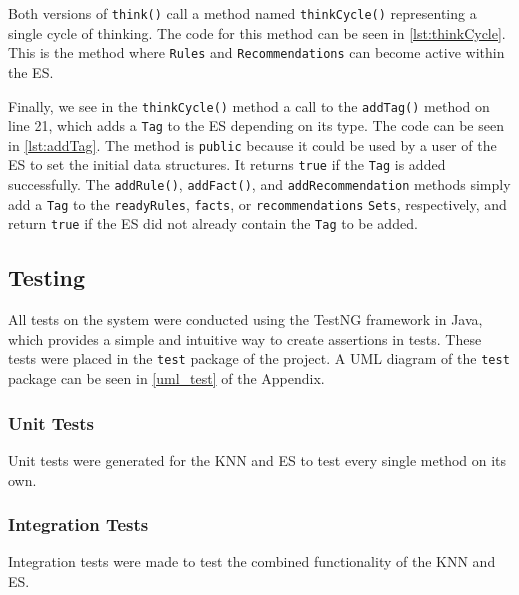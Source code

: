 \documentclass[titlepage,11pt]{article}
\def \espath {"/Users/seanstappas1/GitHub/prometheus-ai/es/ExpertSystem.java"}
\newcommand{\code}[1]{\texttt{#1}}
\begin{document}
Both versions of \code{think()} call a method named \code{thinkCycle()} representing a single cycle of thinking. The code for this method can be seen in \autoref{lst:thinkCycle}. This is the method where \code{Rules} and \code{Recommendations} can become active within the ES.



Finally, we see in the \code{thinkCycle()} method a call to the \code{addTag()} method on line 21, which adds a \code{Tag} to the ES depending on its type. The code can be seen in \autoref{lst:addTag}. The method is \code{public} because it could be used by a user of the ES to set the initial data structures. It returns \code{true} if the \code{Tag} is added successfully. The \code{addRule()}, \code{addFact()}, and \code{addRecommendation} methods simply add a \code{Tag} to the \code{readyRules}, \code{facts}, or \code{recommendations} \code{Sets}, respectively, and return \code{true} if the ES did not already contain the \code{Tag} to be added.



\subsection{Testing}

All tests on the system were conducted using the TestNG framework in Java, which provides a simple and intuitive way to create assertions in tests. These tests were placed in the \code{test} package of the project. A UML diagram of the \code{test} package can be seen in \autoref{uml_test} of the Appendix.

\subsubsection{Unit Tests}

Unit tests were generated for the KNN and ES to test every single method on its own.

\subsubsection{Integration Tests}

Integration tests were made to test the combined functionality of the KNN and ES.
\end{document}
